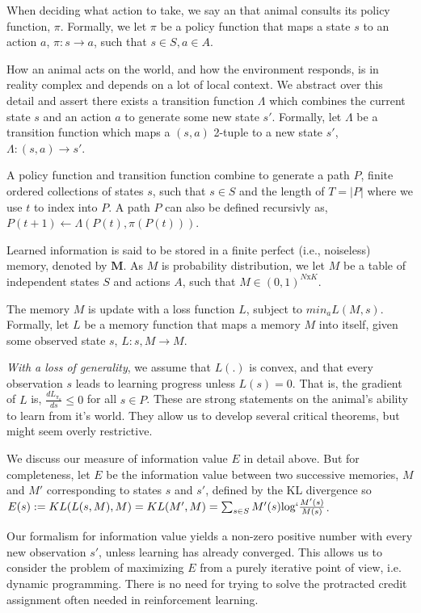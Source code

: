 \documentclass[9pt,twocolumn,twoside]{pnas-new}
\begin{document}
{{When deciding what action to take, we say an that animal consults its policy function, $\pi$. Formally, we let $\pi$ be a policy function that maps a state $s$ to an action $a$, $\pi : s \rightarrow a$, such that $s \in S, a \in A$.

How an animal acts on the world, and how the environment responds, is in reality complex and depends on a lot of local context. %
 We abstract over this detail and assert there exists a transition function $\Lambda$ which combines the current state $s$ and an action $a$ to generate some new state $s'$. Formally, let $\Lambda$ be a transition function which maps a $(s,a)$ 2-tuple to a new state $s'$, $\Lambda : (s, a) \rightarrow s'$. 

A policy function and transition function combine to generate a path $P$, finite ordered collections of states $s$, such that $s \in S$ and the length of $T = |P|$ where we use $t$ to index into $P$. A path $P$ can also be defined recursivly as, $P(t+1) \leftarrow \Lambda(P(t), \pi(P(t)))$.

Learned information is said to be stored in a finite perfect (i.e., noiseless) memory, denoted by $\textbf{M}$. As $M$ is probability distribution, we let $M$ be a table of independent states $S$ and actions $A$, such that $M \in (0, 1)^{N\text{x}K}$. %

The memory $M$ is update with a loss function $L$, subject to $min_a L(M, {s})$. Formally, let $L$ be a memory function that maps a memory $M$ into itself, given some observed state $s$, $L : s, M \rightarrow M$. 


\textit{With a loss of generality}, we assume that $L(.)$ is convex, and that every observation $s$ leads to learning progress unless $L(s) = 0$. That is, the gradient of $L$ is, $\frac{dL_{\pi_{a}}}{ds} \leq 0$ for all $s \in P$. These are strong statements on the animal's ability to learn from it's world. They allow us to develop several critical theorems, but might seem overly restrictive.

We discuss our measure of information value $E$ in detail above. But for completeness, let $E$ be the information value between two successive memories, $M$ and $M'$ corresponding to states $s$ and $s'$, defined by the KL divergence so $E(s) := KL(L(s, M), M) = KL(M', M) = \sum_{s \in S} M'(s) \text{log} `\frac{M'(s)}{M(s)} $. 

Our formalism for information value yields a non-zero positive number with every new observation $s'$, unless learning has already converged. This allows us to consider the problem of maximizing $E$ from a purely iterative point of view, i.e. dynamic programming. There is no need for trying to solve the protracted credit assignment often needed in reinforcement learning.

}}
\end{document}
